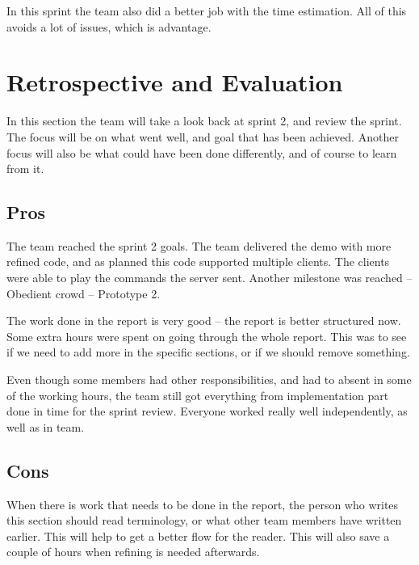 In this sprint the team also did a better job with the time estimation. 
All of this avoids a lot of issues, which is advantage. 
  

\section{Retrospective and Evaluation}
In this section the team will take a look back at sprint 2, and review the sprint. 
The focus will be on what went well, and goal that has been achieved. 
Another focus will also be what could have been done differently, and of course to learn from it.

\subsection{Pros}
The team reached the sprint 2 goals. 
The team delivered the demo with more refined code, and as planned this code supported multiple clients. 
The clients were able to play the commands the server sent.
Another milestone was reached -- Obedient crowd -- Prototype 2.

The work done in the report is very good -- the report is better structured now.
Some extra hours were spent on going through the whole report. 
This was to see if we need to add more in the specific sections, or if we should remove something.  

Even though some members had other responsibilities, and had to absent in some of the working hours, the team still got everything from implementation part done in time for the sprint review. Everyone worked really well independently, as well as in team. 



\subsection{Cons}

When there is work that needs to be done in the report, the person who writes this section should read terminology, or what other team members have written earlier. 
This will help to get a better flow for the reader.
This will also save a couple of hours when refining is needed afterwards. 

